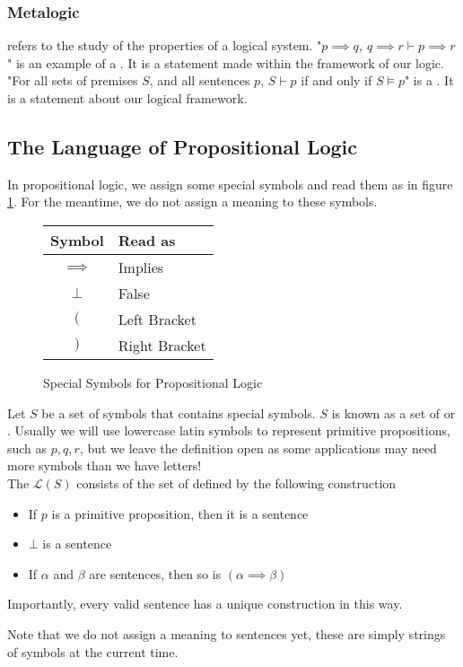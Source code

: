 \documentclass[11pt]{article}
\begin{document}
\subsubsection{Metalogic}
\label{sec:informalMetalogic}
 refers to the study of the properties of a logical system.
\mypar
"$p \implies q, \ q \implies r \vdash p \implies r$" is an example of a . It is a statement made within the framework of our logic.
\mypar
"For all sets of premises $S$, and all sentences $p$, $S \vdash p$ if and only if $S \vDash p$" is a . It is a statement about our logical framework.

\pagebreak


\pagebreak
\subsection{The Language of Propositional Logic}
In propositional logic, we assign some special symbols and read them as in figure \ref{fig:specialSymbolsProp}. For the meantime, we do not assign a meaning to these symbols.
\begin{figure}[H]
    \caption{Special Symbols for Propositional Logic}
    \label{fig:specialSymbolsProp}
    \centering
    \begin{tabular}{|c|l|}
        \hline
        Symbol & Read as \\ \hline \hline
        $\implies$ & Implies \\ \hline
        $\bot$ & False \\ \hline
        $($ & Left Bracket \\ \hline
        $)$ & Right Bracket \\ \hline
    \end{tabular}
\end{figure}
\begin{defi}
    Let $S$ be a set of symbols that contains special symbols. $S$ is known as a set of  or . Usually we will use lowercase latin symbols to represent primitive propositions, such as $p,q,r$, but we leave the definition open as some applications may need more symbols than we have letters!\\ The  $\mathcal{L}(S)$ consists of the set of  defined by the following construction
    \begin{itemize}
        \item If $p$ is a primitive proposition, then it is a sentence
        \item $\bot$ is a sentence
        \item If $\alpha$ and $\beta$ are sentences, then so is $(\alpha \implies \beta)$
    \end{itemize}
    Importantly, every valid sentence has a unique construction in this way.
\end{defi}
Note that we do not assign a meaning to sentences yet, these are simply strings of symbols at the current time. 
\printindex
\end{document}
